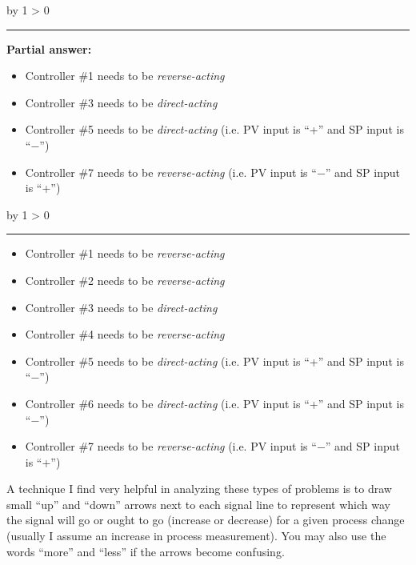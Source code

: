 \documentclass[12pt,a4paper]{article}
\def\svar{
           \advance\answnum by 1
           \ifnum \answnum > 0
                \hrule
                \vskip 3pt
                \leftline{Svar \the\answnum}
                \vskip 3pt \fi}
\def\notes{
           \advance\explnum by 1
           \ifnum \explnum > 0
                \hrule
                \vskip 3pt
                \leftline{Notes \the\explnum}
                \vskip 3pt \fi}
\begin{document}
\vskip 10pt \filbreak 





\svar{} 

\noindent
{\bf Partial answer:}

\begin{itemize}
\item{} Controller \#1 needs to be {\it reverse-acting}
\item{} Controller \#3 needs to be {\it direct-acting}
\item{} Controller \#5 needs to be {\it direct-acting} (i.e. PV input is ``+'' and SP input is ``$-$'')
\item{} Controller \#7 needs to be {\it reverse-acting} (i.e. PV input is ``$-$'' and SP input is ``+'')
\end{itemize}

\vskip 10pt \filbreak 





\notes{} 

\begin{itemize}
\item{} Controller \#1 needs to be {\it reverse-acting}
\item{} Controller \#2 needs to be {\it reverse-acting}
\item{} Controller \#3 needs to be {\it direct-acting}
\item{} Controller \#4 needs to be {\it reverse-acting}
\item{} Controller \#5 needs to be {\it direct-acting} (i.e. PV input is ``+'' and SP input is ``$-$'')
\item{} Controller \#6 needs to be {\it direct-acting} (i.e. PV input is ``+'' and SP input is ``$-$'')
\item{} Controller \#7 needs to be {\it reverse-acting} (i.e. PV input is ``$-$'' and SP input is ``+'')
\end{itemize}

\vskip 10pt

A technique I find very helpful in analyzing these types of problems is to draw small ``up'' and ``down'' arrows next to each signal line to represent which way the signal will go or ought to go (increase or decrease) for a given process change (usually I assume an increase in process measurement).  You may also use the words ``more'' and ``less'' if the arrows become confusing.

\vskip 10pt
\end{document}
